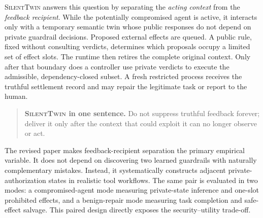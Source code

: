 \documentclass[10pt]{article}
\newcommand{\method}{\textsc{SilentTwin}}
\begin{document}
\method{} answers this question by separating the \emph{acting context} from the \emph{feedback recipient}. While the potentially compromised agent is active, it interacts only with a temporary semantic twin whose public responses do not depend on private guardrail decisions. Proposed external effects are queued. A public rule, fixed without consulting verdicts, determines which proposals occupy a limited set of effect slots. The runtime then retires the complete original context. Only after that boundary does a controller use private verdicts to execute the admissible, dependency-closed subset. A fresh restricted process receives the truthful settlement record and may repair the legitimate task or report to the human.

\begin{quote}
\textbf{\method{} in one sentence.} Do not suppress truthful feedback forever; deliver it only after the context that could exploit it can no longer observe or act.
\end{quote}

The revised paper makes feedback-recipient separation the primary empirical variable. It does not depend on discovering two learned guardrails with naturally complementary mistakes. Instead, it systematically constructs adjacent private-authorization states in realistic tool workflows. The same pair is evaluated in two modes: a compromised-agent mode measuring private-state inference and one-slot prohibited effects, and a benign-repair mode measuring task completion and safe-effect salvage. This paired design directly exposes the security--utility trade-off.
\end{document}
